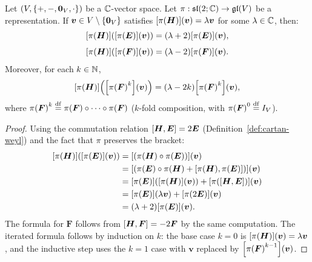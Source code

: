 \documentclass[11pt,reqno]{amsart}
\begin{document}
\begin{lemma}\label{lem:raising-lowering}
Let $\Br{V,\set{+,-,\bm0_V,\cdot}}$ be a $\mathbb{C}$-vector space.
Let $\pi:\mathfrak{sl}(2;\mathbb{C})\to\mathfrak{gl}(V)$ be a representation.
If $\bm v\in V\setminus\set{\bm0_V}$ satisfies
$\FUNC{\pi(\bm H)}{\bm v}=\lambda \bm v$ for some $\lambda\in\mathbb{C}$, then:
\[
\begin{aligned}
\FUNC{\pi(\bm H)}{\FUNC{\pi(\bm E)}{\bm v}}&=(\lambda+2)\FUNC{\pi(\bm E)}{\bm v},\\[4pt]
\FUNC{\pi(\bm H)}{\FUNC{\pi(\bm F)}{\bm v}}&=(\lambda-2)\FUNC{\pi(\bm F)}{\bm v}.
\end{aligned}
\]
Moreover, for each $k\in\mathbb{N}$,
\[
\FUNC{\pi(\bm H)}{\FUNC{\pi\Br{\bm F}^k}{\bm v}}=(\lambda-2k)\FUNC{\pi\Br{\bm F}^k}{\bm v},
\]
where $\pi\Br{\bm F}^k\df\pi(\bm F)\circ\cdots\circ\pi(\bm F)$
($k$-fold composition, with $\pi\Br{\bm F}^0\df I_V$).
\end{lemma}
\begin{proof}
Using the commutation relation $\SqBr{\bm H,\bm E}=2\bm E$
(Definition~\ref{def:cartan-weyl}) and the fact that $\pi$ preserves the bracket:
\[
\begin{aligned}
\FUNC{\pi(\bm H)}{\FUNC{\pi(\bm E)}{\bm v}}
&=\FUNC{(\pi(\bm H)\circ\pi(\bm E))}{\bm v} \\
&=\FUNC{(\pi(\bm E)\circ\pi(\bm H)+\SqBr{\pi(\bm H),\pi(\bm E)})}{\bm v} \\
&=\FUNC{\pi(\bm E)}{\FUNC{\pi(\bm H)}{\bm v}}
+\FUNC{\pi\Br{\SqBr{\bm H,\bm E}}}{\bm v} \\
&=\FUNC{\pi(\bm E)}{\lambda \bm v}+\FUNC{\pi(2\bm E)}{\bm v}\\
&=(\lambda+2)\FUNC{\pi(\bm E)}{\bm v}.\\
\end{aligned}
\]
The formula for $\bm F$ follows from
$\SqBr{\bm H,\bm F}=-2\bm F$ by the same computation.
The iterated formula follows by induction on $k$:
the base case $k=0$ is $\FUNC{\pi(\bm H)}{\bm v}=\lambda \bm v$,
and the inductive step uses the $k=1$ case with
$\bm v$ replaced by $\FUNC{\pi\Br{\bm F}^{k-1}}{\bm v}$.
\end{proof}
\end{document}

